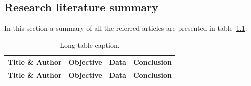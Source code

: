 \begin{landscape}
	\chapter{Research literature summary}
In this section a summary of all the referred articles are presented in table~\ref{my-label}.

	\hskip-5.0cm 
	\begin{longtable}[c]{|p{4cm}|p{6cm}|p{4cm}|p{6cm}|}
				\caption{Long table caption.\label{my-label}}\\
		\hline
				\rowcolor[HTML]{000000} 
				{\color[HTML]{FFFFFF} \textbf{Title \& Author}} & {\color[HTML]{FFFFFF} \textbf{Objective}} & {\color[HTML]{FFFFFF} \textbf{Data}} & {\color[HTML]{FFFFFF} \textbf{Conclusion}} \\ \hline
		\endfirsthead
		
		\hline
				\rowcolor[HTML]{000000} 
				{\color[HTML]{FFFFFF} \textbf{Title \& Author}} & {\color[HTML]{FFFFFF} \textbf{Objective}} & {\color[HTML]{FFFFFF} \textbf{Data}} & {\color[HTML]{FFFFFF} \textbf{Conclusion}} \\ \hline
		\hline
		\endhead
		
		

\end{longtable}
\end{landscape}
